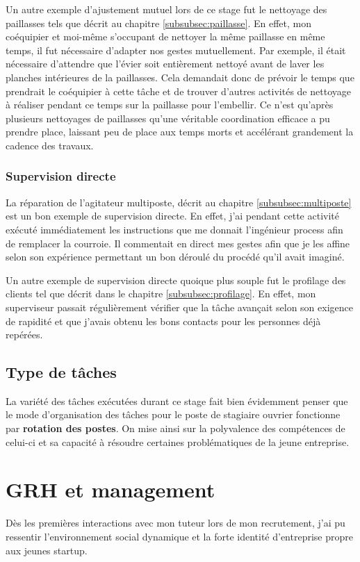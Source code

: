 \documentclass{rapportENSCP}
\begin{document}
Un autre exemple d'ajustement mutuel lors de ce stage fut le nettoyage des paillasses tels que décrit au chapitre \ref{subsubsec:paillasse}. En effet, mon coéquipier et moi-même s'occupant de nettoyer la même paillasse en même temps, il fut nécessaire d'adapter nos gestes mutuellement. Par exemple, il était nécessaire d'attendre que l'évier soit entièrement nettoyé avant de laver les planches intérieures de la paillasses. Cela demandait donc de prévoir le temps que prendrait le coéquipier à cette tâche et de trouver d'autres activités de nettoyage à réaliser pendant ce temps sur la paillasse pour l'embellir. Ce n'est qu'après plusieurs nettoyages de paillasses qu'une véritable coordination efficace a pu prendre place, laissant peu de place aux temps morts et accélérant grandement la cadence des travaux.

\subsubsection{Supervision directe}
La réparation de l'agitateur multiposte, décrit au chapitre \ref{subsubsec:multiposte}  est un bon exemple de supervision directe. En effet, j'ai pendant cette activité exécuté immédiatement les instructions que me donnait l'ingénieur process afin de remplacer la courroie. Il commentait en direct mes gestes afin que je les affine selon son expérience permettant un bon déroulé du procédé qu'il avait imaginé.

Un autre exemple de supervision directe quoique plus souple fut le profilage des clients tel que décrit dans le chapitre \ref{subsubsec:profilage}. En effet, mon superviseur passait régulièrement vérifier que la tâche avançait selon son exigence de rapidité et que j'avais obtenu les bons contacts pour les personnes déjà repérées.

\subsection{Type de tâches}
La variété des tâches exécutées durant ce stage fait bien évidemment penser que le mode d'organisation des tâches pour le poste de stagiaire ouvrier fonctionne par \textbf{rotation des postes}. On mise ainsi sur la polyvalence des compétences de celui-ci et sa capacité à résoudre certaines problématiques de la jeune entreprise.

\section{GRH et management}
Dès les premières interactions avec mon tuteur lors de mon recrutement, j'ai pu ressentir l'environnement social dynamique et la forte identité d'entreprise propre aux jeunes startup.
\end{document}
